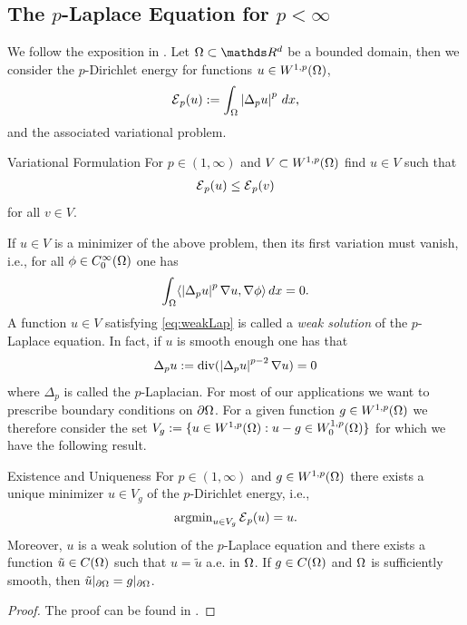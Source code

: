 \subsection{The $p$-Laplace Equation for $p<\infty$}\label{sec:pLap}
We follow the exposition in \cite{lindqvist2017notes}. Let $\domain\subset\R^d$ be a bounded domain, then 
we consider the $p$-Dirichlet energy for functions $u\in W^{1,p}(\Omega)$,
%
\begin{align}\label{eq:DirichletEnergy}
\mathcal{E}{}_p(u) := \int_\Omega \left|\Delta_p u\right|^p \, dx,
\end{align}
%
and the associated variational problem.
%
\begin{problem}{Variational Formulation}{}
For $p\in (1,\infty)$ and $V\subset W^{1,p}(\Omega)$ find $u\in V$ such that
%
\begin{align*}
\mathcal{E}{}_p(u) \leq \mathcal{E}{}_p(v)
\end{align*}
%
for all $v\in V$.
\end{problem}
%
If $u\in V$ is a minimizer of the above problem, then its first variation must vanish, i.e., for all $\phi\in C^\infty_0(\Omega)$ 
one has
%
\begin{align}\label{eq:weakLap}
\int_\Omega \langle \left|\Delta_p u\right|^p \nabla u, \nabla \phi \rangle \, dx = 0.
\end{align}
%
A function $u\in V$ satisfying \cref{eq:weakLap} is called a \emph{weak solution} of the $p$-Laplace equation. In fact, if $u$ 
is smooth enough one has that
%
\begin{align}\label{eq:strongLap}
\Delta_p u := \operatorname{div}(\left|\Delta_p u\right|^{p-2} \nabla u) = 0
\end{align}
%
where $\Delta_p$ is called the $p$-Laplacian. For most of our applications we want to prescribe boundary conditions on $\partial \Omega$. 
For a given function $g\in W^{1,p}(\Omega)$ we therefore consider the set 
$V_g := \{u\in W^{1,p}(\Omega): u-g \in W^{1,p}_0(\Omega)\}$ for which we have the following result.
%
\begin{theorem}{Existence and Uniqueness}{}
For $p\in (1,\infty)$ and $g\in W^{1,p}(\Omega)$ there exists a unique minimizer $u\in V_g$ of the $p$-Dirichlet energy, i.e.,
%
\begin{align*}
\operatorname{argmin}_{u\in V_g} \mathcal{E}{}_p(u) = u.
\end{align*}
%
Moreover, $u$ is a weak solution of the $p$-Laplace equation and there exists a function $\tilde{u}\in C(\Omega)$ such that
$u = \tilde{u}$ a.e. in $\Omega$. If $g\in C(\Omega)$ and $\Omega$ is sufficiently smooth, then 
$\tilde{u}\vert_{\partial \Omega} = g\vert_{\partial \Omega}$.
\end{theorem}
%
%
\begin{proof}
The proof can be found in \cite[Thm. 2.16]{lindqvist2017notes}.
\end{proof}
%
%

